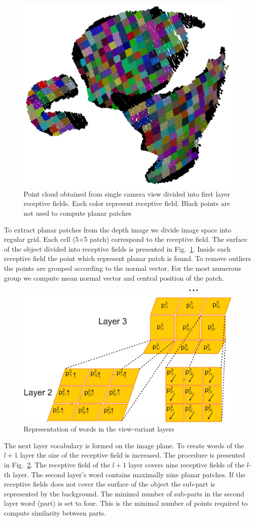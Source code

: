 \documentclass[letterpaper,10pt,conference]{ieeeconf}  %
\begin{document}
\begin{figure}[t]
 \centering
\includegraphics[width=0.5\columnwidth]{images/recFields1.eps}
\caption{Point cloud obtained from single camera view divided into first layer receptive fields. Each color represent receptive field. Black points are not used to compute planar patches}
 \label{recFields1}
\end{figure}

To extract planar patches from the depth image we divide image space into regular grid. Each cell (5$\times$5 patch) correspond to the receptive field. The surface of the object divided into receptive fields is presented in Fig.~\ref{recFields1}. Inside each receptive field the point which represent planar patch is found. To remove outliers the points are grouped according to the normal vector. For the most numerous group we compute mean normal vector and central position of the patch.

\begin{figure}[t]
 \centering
\includegraphics[width=0.9\columnwidth]{images/word.eps}
\caption{Representation of words in the view-variant layers}
 \label{word}
\end{figure}

The next layer vocabulary is formed on the image plane. To create words of the $l+1$ layer the size of the receptive field is increased. The procedure is presented in Fig.~\ref{word}. The receptive field of the $l+1$ layer covers nine receptive fields of the $l$-th layer. The second layer's word contains maximally nine planar patches. If the receptive fields does not cover the surface of the object the sub-part is represented by the background. The minimal number of sub-parts in the second layer word (part) is set to four. This is the minimal number of points required to compute similarity between parts.
\end{document}
